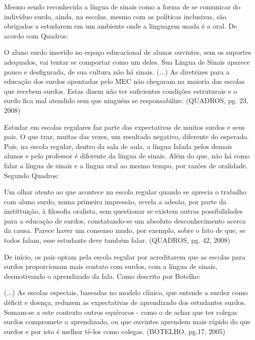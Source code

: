 \documentclass[brasil]{abnt}
\begin{document}
	Mesmo sendo reconhecida a língua de sinais como a forma de se comunicar do indivíduo surdo, ainda, na escolas, mesmo com as políticas inclusivas, são obrigados a estudarem em um ambiente onde
	a linguagem usada é a oral. De acordo com Quadros:
					
		\begin{citacao}O aluno surdo inserido no espaço educacional de alunos ouvintes, sem os suportes adequados, vai tentar se comportar como um deles. Sua Língua de Sinais aparece pouco e desfigurada, 
						de sua cultura não há sinais. (...) As diretrizes para a educação dos surdos apontadas pelo MEC não chegaram na maioria das escolas que recebem surdos. Estas dizem não ter suficientes 
						condições estruturais e o surdo fica mal atendido sem que ninguém se responsabilize. (QUADROS, pg. 23, 2008)
		\end{citacao}
		
			
	Estudar em escolas regulares faz parte das expectativas de muitos surdos e seus pais. O que traz, muitas das vezes, um resultado negativo, diferente do esperado.
	Pois, na escola regular, dentro da sala de aula, a língua falada pelos demais alunos e pelo professor é diferente da língua de sinais. Além do que, não há como falar
	a língua de sinais e a língua oral ao mesmo tempo, por razões de oralidade. Segundo Quadros:
	
		\begin{citacao} Um olhar atento ao que acontece na escola regular quando se aprecia o trabalho com aluno surdo, numa primeira impressão, revela a adesão, por parte
						da instittuição, à filosofia oralista, sem questionar se existem outras possibilidades para a educação de surdos, constatando-se um absoluto 
						desconhecimento acerca da causa. Parece haver um consenso mudo, por exemplo, sobre o fato de que, se todos falam, esse estudante deve também falar.
						(QUADROS, pg. 42, 2008)
		\end{citacao}
	
	De início, os pais optam pela escola regular por acreditarem que as escolas para surdos proporcionam mais contato com surdos, com a língua de sinais, desmotivando o
	aprendizado da fala. Como descrito por Botelho:
	
		\begin{citacao}(...) As escolas especiais, baseadas no modelo clínico, que entende a surdez como déficit e doença, reduzem as expectativas de aprendizado dos 
						estudantes surdos. Somam-se a este contexto outros equívocos - como o de achar que ter colegas surdos compromete o aprendizado, ou que ouvintes 
						aprendem mais rápido do que surdos e por isto é melhor tê-los como colegas. (BOTELHO, pg.17, 2005)
		\end{citacao}
	
\end{document}
